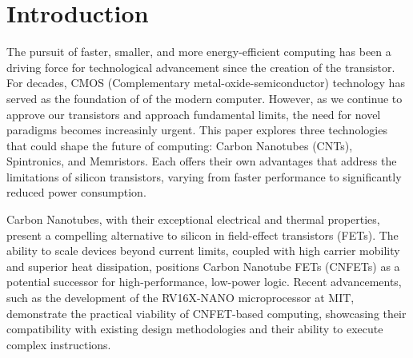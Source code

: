 \documentclass[sigconf]{acmart}
\begin{document}

\maketitle

\section{Introduction}
The pursuit of faster, smaller, and more energy-efficient computing
has been a driving force for technological advancement since the 
creation of the transistor. For decades, CMOS (Complementary
metal-oxide-semiconductor) technology has served as the foundation 
of of the modern computer. However, as we continue to approve our 
transistors and approach fundamental limits, the need for novel 
paradigms becomes increasinly urgent. This paper explores three 
technologies that could shape the future of computing: Carbon Nanotubes
(CNTs), Spintronics, and Memristors. Each offers their own 
advantages that address the limitations of silicon transistors,
varying from faster performance to significantly reduced power 
consumption. 

Carbon Nanotubes, with their exceptional electrical and thermal 
properties, present a compelling alternative to silicon in 
field-effect transistors (FETs). The ability to scale devices 
beyond current limits, coupled with high carrier mobility and 
superior heat dissipation, positions Carbon Nanotube FETs (CNFETs) 
as a potential successor for high-performance, low-power logic. 
Recent advancements, such as the development of the RV16X-NANO 
microprocessor at MIT, demonstrate the practical viability of 
CNFET-based computing, showcasing their compatibility with 
existing design methodologies and their ability to execute 
complex instructions.
\end{document}
